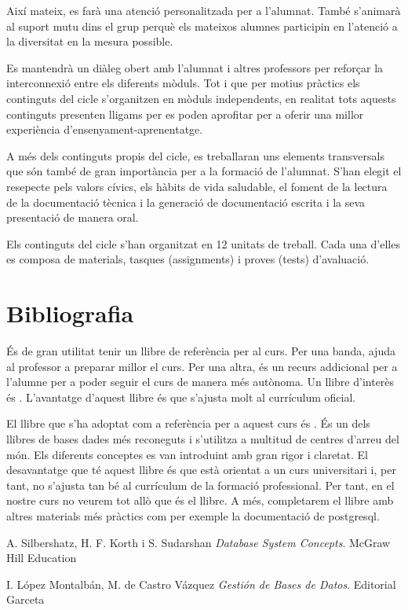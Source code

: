 \documentclass[catalan, a4paper, 12pt, titlepage]{article}
\begin{document}
Així mateix, es farà una atenció personalitzada per a l'alumnat.
També s'animarà al suport mutu dins el grup perquè els mateixos alumnes participin en l'atenció a la diversitat en la mesura possible.

Es mantendrà un diàleg obert amb l'alumnat i altres professors per reforçar la interconnexió entre els diferents mòduls.
Tot i que per motius pràctics els continguts del cicle s'organitzen en mòduls independents, en realitat tots aquests continguts presenten lligams per es poden aprofitar per a oferir una millor experiència d'ensenyament-aprenentatge.

A més dels continguts propis del cicle, es treballaran uns elements transversals que són també de gran importància per a la formació de l'alumnat. 
S'han elegit el resepecte pels valors cívics, els hàbits de vida saludable, el foment de la lectura de la documentació tècnica i la generació de documentació escrita i la seva presentació de manera oral.

Els continguts del cicle s'han organitzat en 12 unitats de treball.
Cada una d'elles es composa de materials, tasques (assignments) i proves (tests) d'avaluació.

\section{Bibliografia}

És de gran utilitat tenir un llibre de referència per al curs.
Per una banda, ajuda al professor a preparar millor el curs.
Per una altra, és un recurs addicional per a l'alumne per a poder seguir el curs de manera més autònoma.
Un llibre d'interès és \cite{montalban2014}.
L'avantatge d'aquest llibre és que s'ajusta molt al currículum oficial.

El llibre que s'ha adoptat com a referència per a aquest curs és \cite{silbershatz2020}.
És un dels llibres de bases dades més reconeguts i s'utilitza a multitud de centres d'arreu del món.
Els diferents conceptes es van introduint amb gran rigor i claretat.
El desavantatge que té aquest llibre és que està orientat a un curs universitari i, per tant, no s'ajusta tan bé al currículum de la formació professional.
Per tant, en el nostre curs no veurem tot allò que és el llibre.
A més, completarem el llibre amb altres materials més pràctics com per exemple la documentació de postgresql.

\begin{thebibliography}{9}
A. Silbershatz, H. F. Korth i S. Sudarshan 
\textit{Database System Concepts}. 
McGraw Hill Education

I. López Montalbán, M. de Castro Vázquez
\textit{Gestión de Bases de Datos}. 
Editorial Garceta

\end{thebibliography}
\end{document}
